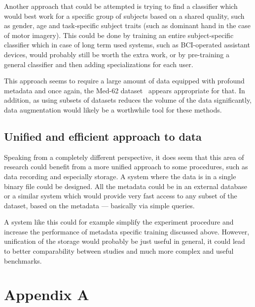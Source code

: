 \documentclass[english, he, bc, kiv, iso690alph]{fasthesis}
\begin{document}
Another approach that could be attempted is trying to find a classifier which would best work for a specific group of subjects based on a shared quality, such as gender, age and task-specific subject traits (such as dominant hand in the case of motor imagery). This could be done by training an entire subject-specific classifier which in case of long term used systems, such as BCI-operated assistant devices, would probably still be worth the extra work, or by pre-training a general classifier and then adding specializations for each user.

This approach seems to require a large amount of data equipped with profound metadata and once again, the Med-62 dataset~\cite{data:stieger:21} appears appropriate for that. In addition, as using subsets of datasets reduces the volume of the data significantly, data augmentation would likely be a worthwhile tool for these methods.

\section{Unified and efficient approach to data}

Speaking from a completely different perspective, it does seem that this area of research could benefit from a more unified approach to some procedures, such as data recording and especially storage. A system where the data is in a single binary file could be designed. All the metadata could be in an external database or a similar system which would provide very fast access to any subset of the dataset, based on the metadata --- basically via simple queries.

A system like this could for example simplify the experiment procedure and increase the performance of metadata specific training discussed above. However, unification of the storage would probably be just useful in general, it could lead to better comparability between studies and much more complex and useful benchmarks.

\appendix
\chapter{Appendix A}

\backmatter
\printbibliography
\backpage
\end{document}
